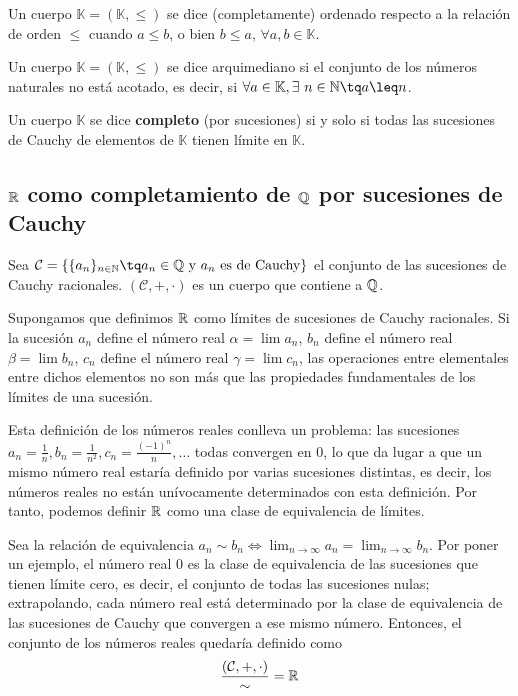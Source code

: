 \begin{defi}
    Un cuerpo $\mathbb{K} = \left(\mathbb{K}, \leq\right)$ se dice (completamente) ordenado respecto a la relación de orden $\leq$ cuando $a\leq b$, o bien $b\leq a$, $\forall a, b\in\mathbb{K}$.
\end{defi}

\begin{defi}
    Un cuerpo $\mathbb{K} = \left(\mathbb{K}, \leq\right)$ se dice arquimediano si el conjunto de los números naturales no está acotado, es decir, si $\forall a\in\mathbb{K}, \exists\ n\in\N\tq a\leq n$.
\end{defi}

\begin{defi}
    Un cuerpo $\mathbb{K}$ se dice \textbf{completo} (por sucesiones) si y solo si todas las sucesiones de Cauchy de elementos de $\mathbb{K}$ tienen límite en $\mathbb{K}$.
\end{defi}

\subsection{$\mathbb{R}$ como completamiento de $\mathbb{Q}$ por sucesiones de Cauchy}
Sea $\mathcal{C} = \{\{a_n\}_{n\in\N}\tq a_n\in\Q \textrm{ y $a_n$ es de Cauchy} \}$ el conjunto de las sucesiones de Cauchy racionales. $\left(\mathcal{C}, +, \cdot\right)$ es un cuerpo que contiene a $\mathbb{Q}$.

Supongamos que definimos $\mathbb{R}$ como límites de sucesiones de Cauchy racionales. Si la sucesión $a_n$ define el número real $\alpha = \lim a_n$, $b_n$ define el número real $\beta = \lim b_n$, $c_n$ define el número real $\gamma = \lim c_n$, las operaciones entre elementales entre dichos elementos no son más que las propiedades fundamentales de los límites de una sucesión.

Esta definición de los números reales conlleva un problema: las sucesiones $a_n = \frac{1}{n}, b_n = \frac{1}{n^2}, c_n = \frac{\left(-1\right)^n}{n}, \ldots$ todas convergen en $0$, lo que da lugar a que un mismo número real estaría definido por varias sucesiones distintas, es decir, los números reales no están unívocamente determinados con esta definición. Por tanto, podemos definir $\mathbb{R}$ como una clase de equivalencia de límites.

Sea la relación de equivalencia $a_n\sim b_n \iff\lim_{n\to\infty}a_n = \lim_{n\to\infty}b_n$. Por poner un ejemplo, el número real $0$ es la clase de equivalencia de las sucesiones que tienen límite cero, es decir, el conjunto de todas las sucesiones nulas; extrapolando, cada número real está determinado por la clase de equivalencia de las sucesiones de Cauchy que convergen a ese mismo número. Entonces, el conjunto de los números reales quedaría definido como
\begin{equation}
    \frac{\left(\mathcal{C}, +, \cdot \right)}{\sim} = \mathbb{R}
\end{equation}


